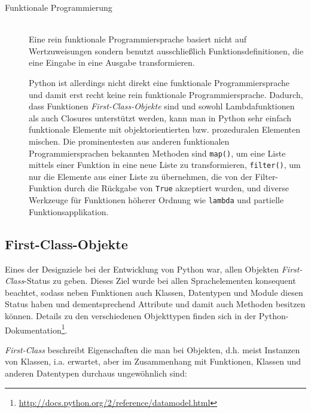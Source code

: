 \begin{description}
\item[Funktionale Programmierung] \hfill \\
Eine rein funktionale Programmiersprache basiert nicht auf Wertzuweisungen sondern benutzt
ausschließlich Funktionsdefinitionen, die eine Eingabe in eine Ausgabe transformieren.
\citep[Kap. 1.3.1]{progsprachen}

Python ist allerdings nicht direkt eine funktionale Programmiersprache und damit erst recht keine
rein funktionale Programmiersprache. Dadurch, dass Funktionen \emph{First-Class-Objekte} sind und
sowohl Lambdafunktionen als auch Closures unterstützt werden, kann man in Python sehr einfach
funktionale Elemente mit objektorientierten bzw. prozeduralen Elementen mischen. Die prominentesten
aus anderen funktionalen Programmiersprachen bekannten Methoden sind \lstinline{map()}, um eine
Liste mittels einer Funktion in eine neue Liste zu transformieren, \lstinline{filter()}, um nur die
Elemente aus einer Liste zu übernehmen, die von der Filter-Funktion durch die Rückgabe von
\lstinline{True} akzeptiert wurden, und diverse Werkzeuge für Funktionen höherer Ordnung wie
\lstinline{lambda} und partielle Funktionsapplikation.
\end{description}



\subsection{First-Class-Objekte}\label{firstclass}

Eines der Designziele bei der Entwicklung von Python war, allen Objekten \emph{First-Class}-Status
\citep{pyhist:firstclass} zu geben. Dieses Ziel wurde bei allen Sprachelementen konsequent beachtet,
sodass neben Funktionen auch Klassen, Datentypen und Module diesen Status haben und dementsprechend
Attribute und damit auch Methoden besitzen können. Details zu den verschiedenen Objekttypen finden
sich in der Python-Dokumentation\footnote{\href{http://docs.python.org/2/reference/datamodel.html}{http://docs.python.org/2/reference/datamodel.html}}.

\emph{First-Class} beschreibt Eigenschaften die man bei Objekten, d.h. meist Instanzen von Klassen,
i.a. erwartet, aber im Zusammenhang mit Funktionen, Klassen und anderen Datentypen durchaus
ungewöhnlich sind:

